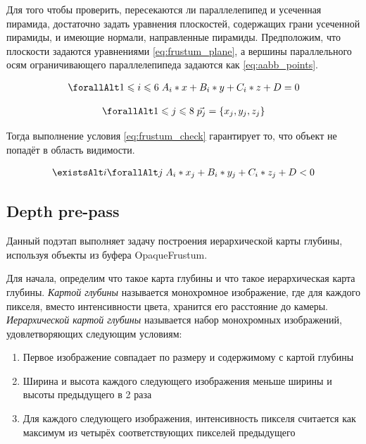 		Для того чтобы проверить, пересекаются ли параллелепипед и усеченная пирамида, достаточно задать уравнения плоскостей, содержащих грани усеченной пирамиды, и имеющие нормали, направленные  пирамиды. Предположим, что плоскости задаются уравнениями \ref{eq:frustum_plane}, а вершины параллельного осям ограничивающего параллелепипеда задаются как \ref{eq:aabb_points}.
		
		\begin{equation} %
			\label{eq:frustum_plane}
			\begin{multlined}
				\forallAlt 1 \le i \le 6 \; A_i * x + B_i * y + C_i * z + D = 0
			\end{multlined}
		\end{equation}
		
		\begin{equation} %
			\label{eq:aabb_points}
			\begin{multlined}
				\forallAlt 1 \le j \le 8 \; \vec{p_j} = \{x_j, y_j, z_j\}
			\end{multlined}
		\end{equation}
		
		Тогда выполнение условия \ref{eq:frustum_check} гарантирует то, что объект не попадёт в область видимости.
		
		\begin{equation} %
			\label{eq:frustum_check}
			\begin{multlined}
				\existsAlt i \forallAlt j \; A_i * x_j + B_i * y_j + C_i * z_j + D < 0
			\end{multlined}
		\end{equation}
				
	\subsection{Depth pre-pass} \label{ch3:pre_pass:depth}
		Данный подэтап выполняет задачу построения иерархической карты глубины, используя объекты из буфера OpaqueFrustum.
		
		Для начала, определим что такое карта глубины и что такое иерархическая карта глубины. \textit{Картой глубины} называется монохромное изображение, где для каждого пикселя, вместо интенсивности цвета, хранится его расстояние до камеры.  \textit{Иерархической картой глубины} называется набор монохромных изображений, удовлетворяющих следующим условиям:
		\begin{enumerate}[1.]
			\item Первое изображение совпадает по размеру и содержимому с картой глубины
			\item Ширина и высота каждого следующего изображения меньше ширины и высоты предыдущего в 2 раза
			\item Для каждого следующего изображения, интенсивность пикселя считается как максимум из четырёх соответствующих пикселей предыдущего
		\end{enumerate}
	
